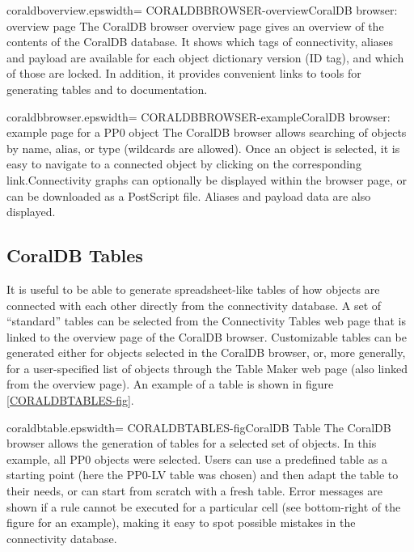 {coraldboverview.eps}{width=\textwidth}
{CORALDBBROWSER-overview}{CoralDB browser: overview page}
{The CoralDB browser overview page gives an overview of the contents of the CoralDB database. It shows which tags of
connectivity, aliases and payload are available for each object dictionary version (ID tag), and which of those are locked.
In addition, it provides convenient links to tools for generating tables and to documentation.}

{coraldbbrowser.eps}{width=\textwidth}
{CORALDBBROWSER-example}{CoralDB browser: example page for a PP0 object}
{The CoralDB browser allows searching of objects by name, alias, or type (wildcards are allowed). Once an object is selected,
it is easy to navigate to a connected object by clicking on the corresponding link.Connectivity graphs can
optionally be displayed within the browser page, or can be downloaded as a PostScript file. Aliases and payload data are also displayed.}



\clearpage
\subsection{CoralDB Tables}
\label{CORALDBTABLES}


It is useful to be able to generate spreadsheet-like tables of how
objects are connected with each other directly from the connectivity
database. A set of ``standard'' tables can be selected from the Connectivity Tables web page that is
linked to the overview page of the CoralDB browser. Customizable tables can be generated
either for objects selected in the CoralDB browser, or, more generally, for a user-specified list of
objects through the Table Maker web page (also linked from the overview page). An example of a table
is shown in figure \ref{CORALDBTABLES-fig}.

{coraldbtable.eps}{width=\textwidth}
{CORALDBTABLES-fig}{CoralDB Table}
{The CoralDB browser allows the generation of tables for a selected set of objects. In this example, all
PP0 objects were selected. Users can use a predefined table as a starting point (here the PP0-LV table was chosen) and
then adapt the table to their needs, or can start from scratch with a fresh table. Error messages are shown if a rule
cannot be executed for a particular cell (see bottom-right of the figure for an example), making it easy to spot possible mistakes in the connectivity database.}


